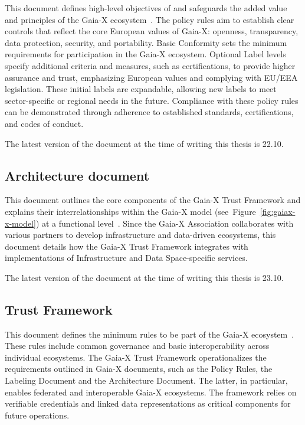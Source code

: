 This document defines high-level objectives of and safeguards the added value and principles of the Gaia-X ecosystem~\cite{gaiax_policy_rules}.
The policy rules aim to establish clear controls that reflect the core European values of Gaia-X: openness, transparency, data protection, security, and portability.
Basic Conformity sets the minimum requirements for participation in the Gaia-X ecosystem.
Optional Label levels specify additional criteria and measures, such as certifications, to provide higher assurance and trust, emphasizing European values and complying with EU/EEA legislation.
These initial labels are expandable, allowing new labels to meet sector-specific or regional needs in the future.
Compliance with these policy rules can be demonstrated through adherence to established standards, certifications, and codes of conduct.

The latest version of the document at the time of writing this thesis is 22.10.

\subsection{Architecture document}\label{subsec:architecture-document}

This document outlines the core components of the Gaia-X Trust Framework and explains their interrelationships within the Gaia-X model (see~Figure~\ref{fig:gaiax-x-model}) at a functional level~\cite{gaiax_architecture_document}.
Since the Gaia-X Association collaborates with various partners to develop infrastructure and data-driven ecosystems, this document details how the Gaia-X Trust Framework integrates with implementations of Infrastructure and Data Space-specific services.

The latest version of the document at the time of writing this thesis is 23.10.

\subsection{Trust Framework}\label{subsec:trust-framework}

This document defines the minimum rules to be part of the Gaia-X ecosystem~\cite{gaiax_trust_framework}.
These rules include common governance and basic interoperability across individual ecosystems.
The Gaia-X Trust Framework operationalizes the requirements outlined in Gaia-X documents, such as the Policy Rules, the Labeling Document and the Architecture Document.
The latter, in particular, enables federated and interoperable Gaia-X ecosystems.
The framework relies on verifiable credentials and linked data representations as critical components for future operations.


